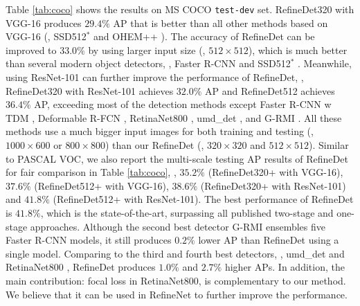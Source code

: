 \documentclass[10pt,twocolumn,letterpaper]{article}
\begin{document}
Table \ref{tab:coco} shows the results on MS COCO {\tt test-dev} set. RefineDet320 with VGG-16 produces $29.4\%$ AP that is better than all other methods based on VGG-16 (\eg, SSD512$^*$ \cite{DBLP:conf/eccv/LiuAESRFB16} and OHEM++ \cite{DBLP:conf/cvpr/ShrivastavaGG16}). The accuracy of RefineDet can be improved to $33.0\%$ by using larger input size (\ie, $512\times512$), which is much better than several modern object detectors, \eg, Faster R-CNN \cite{DBLP:journals/pami/RenHG017} and SSD512$^*$ \cite{DBLP:conf/eccv/LiuAESRFB16}. Meanwhile, using ResNet-101 can further improve the performance of RefineDet, \ie, RefineDet320 with ResNet-101 achieves $32.0\%$ AP and RefineDet512 achieves $36.4\%$ AP, exceeding most of the detection methods except Faster R-CNN w TDM \cite{DBLP:journals/corr/ShrivastavaSMG16}, Deformable R-FCN \cite{DBLP:conf/iccv/DaiQXLZHW17}, RetinaNet800 \cite{DBLP:conf/iccv/LinPRK17}, umd\_det \cite{DBLP:conf/iccv/BodlaSCD17}, and G-RMI \cite{DBLP:conf/cvpr/HuangRSZKFFWSG016}. All these methods use a much bigger input images for both training and testing (\ie, $1000\times600$ or $800\times800$) than our RefineDet (\ie, $320\times320$ and $512\times512$). Similar to PASCAL VOC, we also report the multi-scale testing AP results of RefineDet for fair comparison in Table \ref{tab:coco}, \ie, $35.2\%$ (RefineDet320+ with VGG-16), $37.6\%$ (RefineDet512+ with VGG-16), $38.6\%$ (RefineDet320+ with ResNet-101) and $41.8\%$ (RefineDet512+ with ResNet-101). The best performance of RefineDet is $41.8\%$, which is the state-of-the-art, surpassing all published two-stage and one-stage approaches. Although the second best detector G-RMI \cite{DBLP:conf/cvpr/HuangRSZKFFWSG016} ensembles five Faster R-CNN models, it still produces $0.2\%$ lower AP than RefineDet using a single model. Comparing to the third and fourth best detectors, \ie, umd\_det \cite{DBLP:conf/iccv/BodlaSCD17} and RetinaNet800 \cite{DBLP:conf/iccv/LinPRK17}, RefineDet produces $1.0\%$ and $2.7\%$ higher APs. In addition, the main contribution: focal loss in RetinaNet800, is complementary to our method. We believe that it can be used in RefineNet to further improve the performance.
\end{document}
